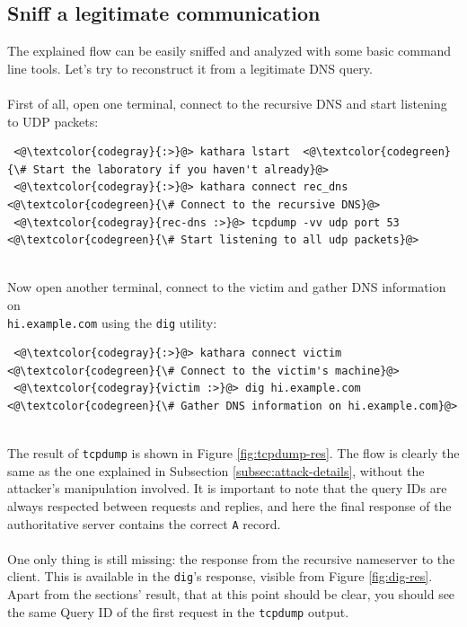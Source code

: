 \documentclass[11pt,a4paper]{article}
\begin{document}
\subsection{Sniff a legitimate communication}
The explained flow can be easily sniffed and analyzed with some basic command line tools. Let's try to reconstruct it from a legitimate DNS query.
\\
\\
\noindent
First of all, open one terminal, connect to the recursive DNS and start listening to UDP packets:
\begin{lstlisting}
 <@\textcolor{codegray}{:>}@> kathara lstart  <@\textcolor{codegreen}{\# Start the laboratory if you haven't already}@>
 <@\textcolor{codegray}{:>}@> kathara connect rec_dns <@\textcolor{codegreen}{\# Connect to the recursive DNS}@>
 <@\textcolor{codegray}{rec-dns :>}@> tcpdump -vv udp port 53    <@\textcolor{codegreen}{\# Start listening to all udp packets}@>
\end{lstlisting}
\noindent
\\
Now open another terminal, connect to the victim and gather DNS information on\\\texttt{hi.example.com} using the \texttt{dig} utility:
\begin{lstlisting}
 <@\textcolor{codegray}{:>}@> kathara connect victim <@\textcolor{codegreen}{\# Connect to the victim's machine}@>
 <@\textcolor{codegray}{victim :>}@> dig hi.example.com    <@\textcolor{codegreen}{\# Gather DNS information on hi.example.com}@>
\end{lstlisting}
\noindent
\\
The result of \texttt{tcpdump} is shown in Figure \ref{fig:tcpdump-res}. The flow is clearly the same as the one explained in Subsection \ref{subsec:attack-details}, without the attacker's manipulation involved. It is important to note that the query IDs are always respected between requests and replies, and here the final response of the authoritative server contains the correct \texttt{A} record.
\\
\\
\noindent
One only thing is still missing: the response from the recursive nameserver to the client. This is available in the \texttt{dig}'s response, visible from Figure \ref{fig:dig-res}. Apart from the sections' result, that at this point should be clear, you should see the same Query ID of the first request in the \texttt{tcpdump} output.
\end{document}
